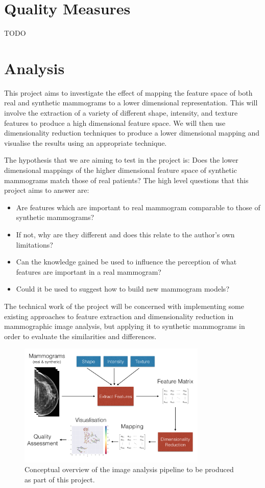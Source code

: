 \section{Quality Measures}
TODO

\section{Analysis}
This project aims to investigate the effect of mapping the feature space of both real and synthetic mammograms to a lower dimensional representation. This will involve the extraction of a variety of different shape, intensity, and texture features to produce a high dimensional feature space. We will then use dimensionality reduction techniques to produce a lower dimensional mapping and visualise the results using an appropriate technique. 

The hypothesis that we are aiming to test in the project is: Does the lower dimensional mappings of the higher dimensional feature space of synthetic mammograms match those of real patients? The high level questions that this project aims to answer are:

\begin{itemize}
	\item Are features which are important to real mammogram comparable to those of synthetic mammograms?
	\item If not, why are they different and does this relate to the author's own limitations?
	\item Can the knowledge gained be used to influence the perception of what features are important in a real mammogram?
	\item Could it be used to suggest how to build new mammogram models?
\end{itemize}

The technical work of the project will be concerned with implementing some existing approaches to feature extraction and dimensionality reduction in mammographic image analysis, but applying it to synthetic mammograms in order to evaluate the similarities and differences.

\begin{figure}
	\label{fig:pipeline-diagram}
	\centering
	\includegraphics[width=0.8\textwidth]{Images/pipeline-diagram.png}	
	\caption{Conceptual overview of the image analysis pipeline to be produced as part of this project.}
\end{figure}

